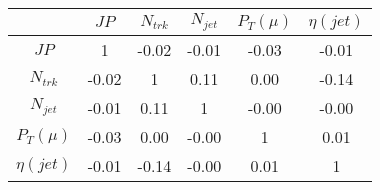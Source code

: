 \begin{tabular}{|c|c|c|c|c|c|} 
\hline
 & $JP$ & $N_{trk}$ & $N_{jet}$ & $P_{T} (\mu)$ & $\eta (jet)$ \\ \hline
$JP$ & 1 & -0.02 & -0.01 & -0.03 & -0.01 \\
$N_{trk}$ & -0.02 & 1 & 0.11 & 0.00 & -0.14 \\
$N_{jet}$ & -0.01 & 0.11 & 1 & -0.00 & -0.00 \\
$P_{T} (\mu)$ & -0.03 & 0.00 & -0.00 & 1 & 0.01 \\
$\eta (jet)$ & -0.01 & -0.14 & -0.00 & 0.01 & 1 \\
\hline 
\end{tabular} 


